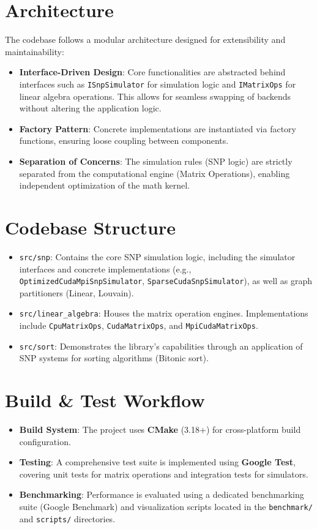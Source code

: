 \documentclass[twocolumn]{article}
\begin{document}
\section*{Architecture}
The codebase follows a modular architecture designed for extensibility and maintainability:
\begin{itemize}
    \item \textbf{Interface-Driven Design}: Core functionalities are abstracted behind interfaces such as \texttt{ISnpSimulator} for simulation logic and \texttt{IMatrixOps} for linear algebra operations. This allows for seamless swapping of backends without altering the application logic.
    \item \textbf{Factory Pattern}: Concrete implementations are instantiated via factory functions, ensuring loose coupling between components.
    \item \textbf{Separation of Concerns}: The simulation rules (SNP logic) are strictly separated from the computational engine (Matrix Operations), enabling independent optimization of the math kernel.
\end{itemize}

\section*{Codebase Structure}
\begin{itemize}
    \item \texttt{src/snp}: Contains the core SNP simulation logic, including the simulator interfaces and concrete implementations (e.g., \texttt{OptimizedCudaMpiSnpSimulator}, \texttt{SparseCudaSnpSimulator}), as well as graph partitioners (Linear, Louvain).
    \item \texttt{src/linear\_algebra}: Houses the matrix operation engines. Implementations include \texttt{CpuMatrixOps}, \texttt{CudaMatrixOps}, and \texttt{MpiCudaMatrixOps}.
    \item \texttt{src/sort}: Demonstrates the library's capabilities through an application of SNP systems for sorting algorithms (Bitonic sort).
\end{itemize}

\section*{Build \& Test Workflow}
\begin{itemize}
    \item \textbf{Build System}: The project uses \textbf{CMake} (3.18+) for cross-platform build configuration.
    \item \textbf{Testing}: A comprehensive test suite is implemented using \textbf{Google Test}, covering unit tests for matrix operations and integration tests for simulators.
    \item \textbf{Benchmarking}: Performance is evaluated using a dedicated benchmarking suite (Google Benchmark) and visualization scripts located in the \texttt{benchmark/} and \texttt{scripts/} directories.
\end{itemize}
\end{document}
